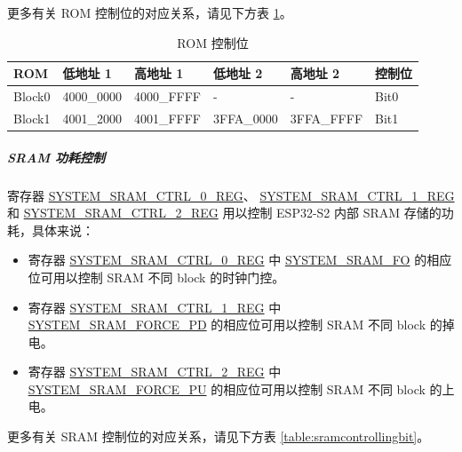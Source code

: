 \documentclass[main\_\_CN.tex]{subfiles}
\begin{document}
更多有关 ROM 控制位的对应关系，请见下方表 \ref{table:romcontrollingbit}。

\begin{table}[H]
    \centering
    \caption{ROM 控制位}
    \label{table:romcontrollingbit}
    \begin{tabular}{|l|l|l|l|l|l|}
    \hline
    \rowcolor{lightgray}
        ROM    & 低地址 1 & 高地址 1 & 低地址 2 & 高地址 2 & 控制位   \\ \hline
        Block0  & \hexprefix{}4000\_0000    & \hexprefix{}4000\_FFFF  &- & -  & Bit0 \\\hline
        Block1  & \hexprefix{}4001\_2000    & \hexprefix{}4001\_FFFF  & \hexprefix{}3FFA\_0000  & \hexprefix{}3FFA\_FFFF & Bit1\\\hline
    \end{tabular}
\end{table}



\subparagraph{SRAM 功耗控制}

寄存器 \hyperref[regdesc:SYSTEMSRAMCTRL0REG]{SYSTEM\_SRAM\_CTRL\_0\_REG}、 \hyperref[regdesc:SYSTEMSRAMCTRL1REG]{SYSTEM\_SRAM\_CTRL\_1\_REG} 和 \hyperref[regdesc:SYSTEMSRAMCTRL2REG]{SYSTEM\_SRAM\_CTRL\_2\_REG} 用以控制 ESP32-S2 内部 SRAM 存储的功耗，具体来说：

\begin{itemize}
    \item 寄存器 \hyperref[regdesc:SYSTEMSRAMCTRL0REG]{SYSTEM\_SRAM\_CTRL\_0\_REG} 中 \hyperref[fielddesc:SYSTEMSRAMFO]{SYSTEM\_SRAM\_FO} 的相应位可用以控制 SRAM 不同 block 的时钟门控。
    \item 寄存器 \hyperref[regdesc:SYSTEMSRAMCTRL1REG]{SYSTEM\_SRAM\_CTRL\_1\_REG} 中  \hyperref[fielddesc:SYSTEMSRAMFORCEPD]{SYSTEM\_SRAM\_FORCE\_PD} 的相应位可用以控制 SRAM 不同 block 的掉电。
    \item 寄存器 \hyperref[regdesc:SYSTEMSRAMCTRL2REG]{SYSTEM\_SRAM\_CTRL\_2\_REG} 中 \hyperref[fielddesc:SYSTEMSRAMFORCEPU]{SYSTEM\_SRAM\_FORCE\_PU} 的相应位可用以控制 SRAM 不同 block 的上电。
\end{itemize}

更多有关 SRAM 控制位的对应关系，请见下方表 \ref{table:sramcontrollingbit}。
\end{document}
